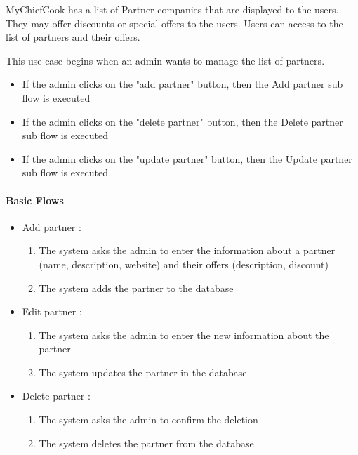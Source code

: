 {
  MyChiefCook has a list of Partner companies that are displayed to the users. They may offer discounts or special offers to the users. Users can access to the list of partners and their offers.

}
{
  This use case begins when an admin wants to manage the list of partners.

  \begin{itemize}
    \item If the admin clicks on the "add partner" button, then the Add partner sub flow is executed
    \item If the admin clicks on the "delete partner" button, then the Delete partner sub flow is executed
    \item If the admin clicks on the "update partner" button, then the Update partner sub flow is executed
  \end{itemize}

  \paragraph{Basic Flows}
  \begin{itemize}
    \item Add partner :
    \begin{enumerate}
      \item The system asks the admin to enter the information about a partner (name, description, website) and their offers (description, discount)
      \item The system adds the partner to the database
    \end{enumerate}
    \item Edit partner :
    \begin{enumerate}
      \item The system asks the admin to enter the new information about the partner
      \item The system updates the partner in the database
    \end{enumerate}
    \item Delete partner :
    \begin{enumerate}
      \item The system asks the admin to confirm the deletion
      \item The system deletes the partner from the database
    \end{enumerate}
  \end{itemize}

}
